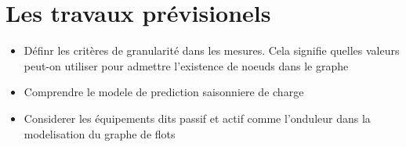 \documentclass [a4paper,10pt]{article}
\begin{document}
	\section{Les travaux pr\'evisionels}
		\begin{itemize}
			\item D\'efinr les crit\`eres de granularit\'e dans les mesures. Cela signifie quelles valeurs peut-on utiliser pour admettre l'existence de noeuds dans le graphe
			\item Comprendre le modele de prediction saisonniere de charge
			\item Considerer les \'equipements dits passif et actif comme l'onduleur dans la modelisation du graphe de flots 
 
		\end{itemize}
\end{document}
